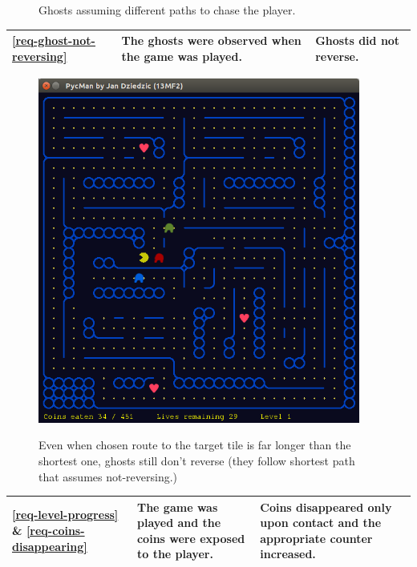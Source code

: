 \documentclass[11pt,a4paper,notitlepage]{report}
\newenvironment{img}{
	\begin{center}
		\begin{figure}[H]
			\begin{center}
			
}{
	\end{center}
		\end{figure}
			\end{center}
}
\begin{document}
\begin{center}
\begin{img}
					\caption{Ghosts assuming different paths to chase the player.}
				\end{img}
				\begin{longtable}{ | p{2cm} | p{5cm} | p{4cm} |}
					\hline	
					\ref{req-ghost-not-reversing}&The ghosts were observed when the game was played.&Ghosts did not reverse. \\ \hline
				\end{longtable}
				\begin{img}
					\includegraphics[width=300pt]{images/player-moved-through-ghost.png}\\
					\caption{Even when chosen route to the target tile is far longer than the shortest one, ghosts still don't reverse (they follow shortest path that assumes not-reversing.)}
				\end{img}
				\begin{longtable}{ | p{2cm} | p{5cm} | p{4cm} |}
					\hline	
					\ref{req-level-progress} \& \ref{req-coins-disappearing}&The game was played and the coins were exposed to the player.&Coins disappeared only upon contact and the appropriate counter increased. \\ \hline
				\end{longtable}
				\begin{img}

\end{img}
\end{center}
\end{document}
